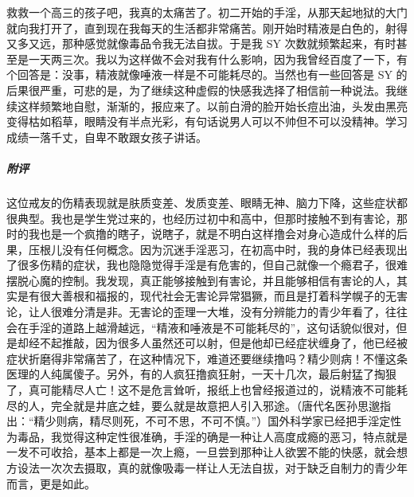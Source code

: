 \begin{case}
    救救一个高三的孩子吧，我真的太痛苦了。初二开始的手淫，从那天起地狱的大门就向我打开了，直到现在我每天的生活都非常痛苦。刚开始时精液是白色的，射得又多又远，那种感觉就像毒品令我无法自拔。于是我 SY 次数就频繁起来，有时甚至是一天两三次。我以为这样做不会对我有什么影响，因为我曾经百度了一下，有个回答是：没事，精液就像唾液一样是不可能耗尽的。当然也有一些回答是 SY 的后果很严重，可悲的是，为了继续这种虚假的快感我选择了相信前一种说法。我继续这样频繁地自慰，渐渐的，报应来了。以前白滑的脸开始长痘出油，头发由黑亮变得枯如稻草，眼睛没有半点光彩，有句话说男人可以不帅但不可以没精神。学习成绩一落千丈，自卑不敢跟女孩子讲话。
    \subparagraph{附评} 这位戒友的伤精表现就是肤质变差、发质变差、眼睛无神、脑力下降，这些症状都很典型。我也是学生党过来的，也经历过初中和高中，但那时接触不到有害论，那时的我也是一个疯撸的瞎子，说瞎子，就是不明白这样撸会对身心造成什么样的后果，压根儿没有任何概念。因为沉迷手淫恶习，在初高中时，我的身体已经表现出了很多伤精的症状，我也隐隐觉得手淫是有危害的，但自己就像一个瘾君子，很难摆脱心魔的控制。我发现，真正能够接触到有害论，并且能够相信有害论的人，其实是有很大善根和福报的，现代社会无害论异常猖獗，而且是打着科学幌子的无害论，让人很难分清是非。无害论的歪理一大堆，没有分辨能力的青少年看了，往往会在手淫的道路上越滑越远，“精液和唾液是不可能耗尽的”，这句话貌似很对，但是却经不起推敲，因为很多人虽然还可以射，但是他却已经症状缠身了，他已经被症状折磨得非常痛苦了，在这种情况下，难道还要继续撸吗？精少则病！不懂这条医理的人纯属傻子。另外，有的人疯狂撸疯狂射，一天十几次，最后射猛了掏狠了，真可能精尽人亡！这不是危言耸听，报纸上也曾经报道过的，说精液不可能耗尽的人，完全就是井底之蛙，要么就是故意把人引入邪途。（唐代名医孙思邈指出：“精少则病，精尽则死，不可不思，不可不慎。”）国外科学家已经把手淫定性为毒品，我觉得这种定性很准确，手淫的确是一种让人高度成瘾的恶习，特点就是一发不可收拾，基本上都是一次上瘾，一旦尝到那种让人欲罢不能的快感，就会想方设法一次次去摄取，真的就像吸毒一样让人无法自拔，对于缺乏自制力的青少年而言，更是如此。
\end{case}

